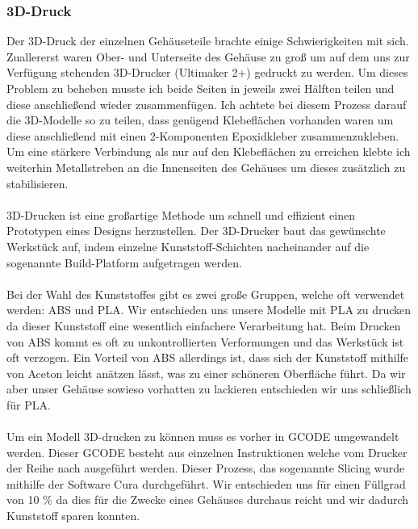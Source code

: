 
\subsubsection{3D-Druck}

Der 3D-Druck der einzelnen Gehäuseteile brachte einige Schwierigkeiten mit sich. Zuallererst waren Ober- und Unterseite des Gehäuse zu groß um auf dem uns zur Verfügung stehenden 3D-Drucker (Ultimaker 2+) gedruckt zu werden. Um dieses Problem zu beheben musste ich beide Seiten in jeweils zwei Hälften teilen und diese anschließend wieder zusammenfügen. Ich achtete bei diesem Prozess  darauf die 3D-Modelle so zu teilen, dass genügend Klebeflächen vorhanden waren um diese anschließend mit einen 2-Komponenten Epoxidkleber zusammenzukleben. Um eine stärkere Verbindung als nur auf den Klebeflächen zu erreichen klebte ich weiterhin Metallstreben an die Innenseiten des Gehäuses um dieses zusätzlich zu stabilisieren.\\
\\
3D-Drucken ist eine großartige Methode um schnell und effizient einen Prototypen eines Designs herzustellen. Der 3D-Drucker baut das gewünschte Werkstück auf, indem einzelne Kunststoff-Schichten nacheinander auf die sogenannte Build-Platform aufgetragen werden.\\
\\
Bei der Wahl des Kunststoffes gibt es zwei große Gruppen, welche oft verwendet werden: ABS und PLA. Wir entschieden uns unsere Modelle mit PLA zu drucken da dieser Kunststoff eine wesentlich einfachere Verarbeitung hat. Beim Drucken von ABS kommt es oft zu unkontrollierten Verformungen und das Werkstück ist oft verzogen. Ein Vorteil von ABS allerdings ist, dass sich der Kunststoff mithilfe von Aceton leicht anätzen lässt, was zu einer schöneren Oberfläche führt. Da wir aber unser Gehäuse sowieso vorhatten zu lackieren entschieden wir uns schließlich für PLA.\\
\\
Um ein Modell 3D-drucken zu können muss es vorher in GCODE umgewandelt werden. Dieser GCODE besteht aus einzelnen Instruktionen welche vom Drucker der Reihe nach ausgeführt werden. Dieser Prozess, das sogenannte Slicing wurde mithilfe der Software Cura durchgeführt. Wir entschieden uns für einen Füllgrad von 10 \% da dies für die Zwecke eines Gehäuses durchaus reicht und wir dadurch Kunststoff sparen konnten.\\
\\